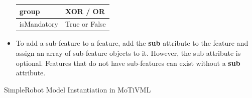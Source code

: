 \documentclass{article}
\newenvironment{longlisting}{\captionsetup{type=listing}}{}
\begin{document}
\begin{itemize}
\begin{table}[H]
\begin{tabular}{|l|p{10cm}|}
				group & XOR / OR \\ \hline
				isMandatory & True or False \\ \hline
				
			\end{tabular}
			\label{tab:valueTypes}
	\end{table}
	
	\item To add a sub-feature to a feature, add the \textbf{sub} attribute to the feature and assign an array of sub-feature objects to it. However, the sub attribute is optional. Features that do not have sub-features can exist without a \textbf{sub} attribute.
	
	
\end{itemize}


\begin{longlisting}
	\caption{SimpleRobot Model Instantiation in MoTiVML}
	\begin{verbatim}
		

\end{verbatim}
\end{longlisting}
\end{document}
